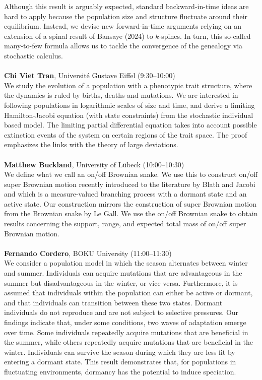 \documentclass[12pt,a4paper]{article}
\begin{document}
 Although this result is arguably expected, standard backward-in-time ideas are hard to apply because the population size and structure fluctuate around their equilibrium. Instead, we devise new forward-in-time arguments relying on an extension of a spinal result of Bansaye (2024) to $k$-spines. In turn, this so-called many-to-few formula allows us to tackle the convergence of the genealogy via stochastic calculus. \\
\\[1ex]{ \large \textbf{ Chi Viet Tran}}, Université Gustave Eiffel (9:30--10:00) \\[2ex] We study the evolution of a population with a phenotypic trait structure, where the dynamics is ruled by births, deaths and mutations. We are interested in following populations in logarithmic scales of size and time, and derive a limiting Hamilton-Jacobi equation (with state constraints) from the stochastic individual based model. The limiting partial differential equation takes into account possible extinction events of the system on certain regions of the trait space. The proof emphasizes the links with the theory of large deviations. \\
\\[1ex]{ \large \textbf{ Matthew Buckland}}, University of Lübeck (10:00--10:30) \\[2ex] We define what we call an on/off Brownian snake. We use this to construct on/off super Brownian motion recently introduced to the literature by Blath and Jacobi and which is a measure-valued branching process with a dormant state and an active state. Our construction mirrors the construction of super Brownian motion from the Brownian snake by Le Gall. We use the on/off Brownian snake to obtain results concerning the support, range, and expected total mass of on/off super Brownian motion. \\
\\[1ex]{ \large \textbf{ Fernando Cordero}}, BOKU University (11:00--11:30) \\[2ex] We consider a population model in which the season alternates between winter and summer. Individuals can acquire mutations that are advantageous in the summer but disadvantageous in the winter, or vice versa.  Furthermore, it is assumed that individuals within the population can either be active or dormant, and that individuals can transition between these two states.  Dormant individuals do not reproduce and are not subject to selective pressures. Our findings indicate that, under some conditions, two waves of adaptation emerge over time. Some individuals repeatedly acquire mutations that are beneficial in the summer, while others repeatedly acquire mutations that are beneficial in the winter. Individuals can survive the season during which they are less fit by entering a dormant state. This result demonstrates that, for populations in fluctuating environments, dormancy has the potential to induce speciation. 
\end{document}
